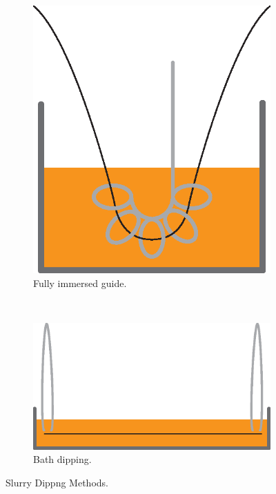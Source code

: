 \begin{figure}[h!]
\begin{subfigure}[b]{0.3\textwidth}
                \includegraphics[width=\textwidth]{./figures/internal-dip-diagram}
                \caption{Fully immersed guide.}
                \label{fig:internal-dip-diagram}
        \end{subfigure}
        ~ %
        \begin{subfigure}[b]{0.3\textwidth}
                \includegraphics[width=\textwidth]{./figures/flat-dip-diagram}
                \caption{Bath dipping.}
                \label{fig:flat-dip-diagram}
        \end{subfigure}
        \caption{Slurry Dippng Methods.}\label{fig:dip-diagram}
\end{figure}

